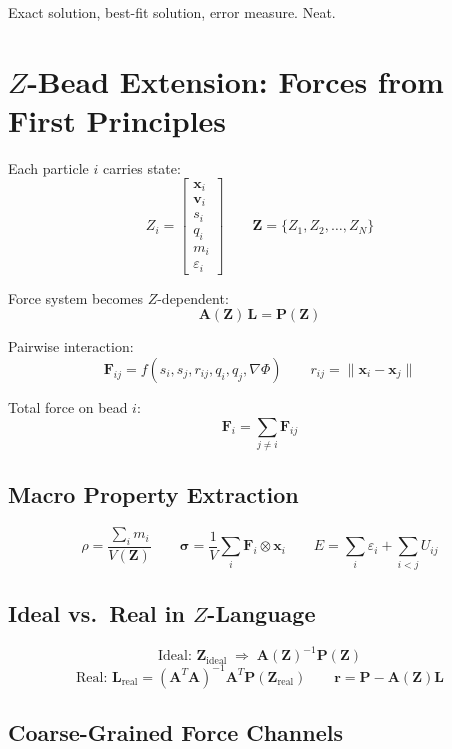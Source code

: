 \documentclass[11pt, letterpaper]{article}
\newcommand{\bL}{\mathbf{L}}
\newcommand{\bA}{\mathbf{A}}
\newcommand{\bP}{\mathbf{P}}
\newcommand{\bx}{\mathbf{x}}
\newcommand{\bv}{\mathbf{v}}
\newcommand{\bF}{\mathbf{F}}
\begin{document}
Exact solution, best-fit solution, error measure. Neat.

\section{$Z$-Bead Extension: Forces from First Principles}

Each particle $i$ carries state:
\[
Z_i =
\begin{bmatrix} \bx_i \\ \bv_i \\ s_i \\ q_i \\ m_i \\ \varepsilon_i \end{bmatrix}
\qquad
\mathbf{Z} = \{Z_1, Z_2, \ldots, Z_N\}
\]

Force system becomes $Z$-dependent:
\[
\bA(\mathbf{Z})\,\bL = \bP(\mathbf{Z})
\]

Pairwise interaction:
\[
\bF_{ij} = f(s_i, s_j, r_{ij}, q_i, q_j, \nabla\Phi)
\qquad r_{ij} = \|\bx_i - \bx_j\|
\]

Total force on bead $i$:
\[
\bF_i = \sum_{j\neq i} \bF_{ij}
\]

\subsection*{Macro Property Extraction}

\[
\rho = \frac{\sum_i m_i}{V(\mathbf{Z})}
\qquad
\boldsymbol{\sigma} = \frac{1}{V}\sum_i \bF_i \otimes \bx_i
\qquad
E = \sum_i \varepsilon_i + \sum_{i<j} U_{ij}
\]

\subsection*{Ideal vs.\ Real in $Z$-Language}

\[
\text{Ideal: } \mathbf{Z}_{\mathrm{ideal}} \;\Rightarrow\; \bA(\mathbf{Z})^{-1}\bP(\mathbf{Z})
\]
\[
\text{Real: } \bL_{\mathrm{real}} = (\bA^T\bA)^{-1}\bA^T\bP(\mathbf{Z}_{\mathrm{real}})
\qquad
\mathbf{r} = \bP - \bA(\mathbf{Z})\bL
\]

\subsection*{Coarse-Grained Force Channels}
\end{document}
